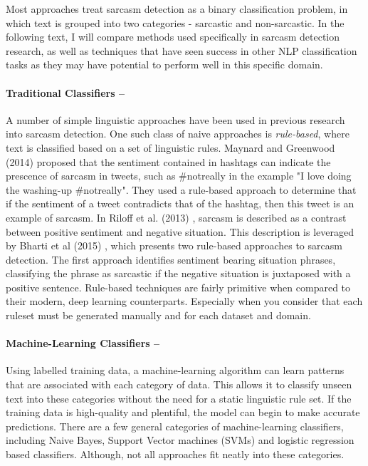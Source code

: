 \documentclass[12pt,a4paper]{article}
\begin{document}
\noindent Most approaches treat sarcasm detection as a binary classification problem, in which text is grouped into two categories - sarcastic and non-sarcastic. In the following text, I will compare methods used specifically in sarcasm detection research, as well as techniques that have seen success in other NLP classification tasks as they may have potential to perform well in this specific domain.

\paragraph{Traditional Classifiers --}
A number of simple linguistic approaches have been used in previous research into sarcasm detection. One such class of naive approaches is \textit{rule-based}, where text is classified based on a set of linguistic rules. Maynard and Greenwood (2014) \cite{maynard2014cares} proposed that the sentiment contained in hashtags can indicate the prescence of sarcasm in tweets, such as \#notreally in the example "I love doing the washing-up \#notreally". They used a rule-based approach to determine that if the sentiment of a tweet contradicts that of the hashtag, then this tweet is an example of sarcasm. In Riloff et al. (2013) \cite{riloff2013sarcasm}, sarcasm is described as a contrast between positive sentiment and negative situation. This description is leveraged by Bharti et al (2015) \cite{bharti2015parsing}, which presents two rule-based approaches to sarcasm detection. The first approach identifies sentiment bearing situation phrases, classifying the phrase as sarcastic if the negative situation is juxtaposed with a positive sentence. Rule-based techniques are fairly primitive when compared to their modern, deep learning counterparts. Especially when you consider that each ruleset must be generated manually and for each dataset and domain.


\paragraph{Machine-Learning Classifiers --}
Using labelled training data, a machine-learning algorithm can learn patterns that are associated with each category of data. This allows it to classify unseen text into these categories without the need for a static linguistic rule set. If the training data is high-quality and plentiful, the model can begin to make accurate predictions. There are a few general categories of machine-learning classifiers, including Naive Bayes, Support Vector machines (SVMs) and logistic regression based classifiers. Although, not all approaches fit neatly into these categories.
\end{document}
